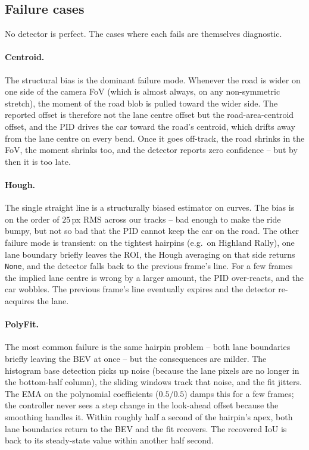 \subsection{Failure cases}

No detector is perfect. The cases where each fails are themselves
diagnostic.

\paragraph{Centroid.}
The structural bias is the dominant failure mode. Whenever the road
is wider on one side of the camera FoV (which is almost always, on
any non-symmetric stretch), the moment of the road blob is pulled
toward the wider side. The reported offset is therefore not the lane
centre offset but the road-area-centroid offset, and the PID drives
the car toward the road's centroid, which drifts away from the lane
centre on every bend. Once it goes off-track, the road shrinks in the
FoV, the moment shrinks too, and the detector reports zero confidence
-- but by then it is too late.

\paragraph{Hough.}
The single straight line is a structurally biased estimator on
curves. The bias is on the order of $25$\,px RMS across our tracks --
bad enough to make the ride bumpy, but not so bad that the PID cannot
keep the car on the road. The other failure mode is transient: on the
tightest hairpins (e.g.\ on Highland Rally), one lane boundary
briefly leaves the ROI, the Hough averaging on that side returns
\texttt{None}, and the detector falls back to the previous frame's
line. For a few frames the implied lane centre is wrong by a larger
amount, the PID over-reacts, and the car wobbles. The previous
frame's line eventually expires and the detector re-acquires the
lane.

\paragraph{PolyFit.}
The most common failure is the same hairpin problem -- both lane
boundaries briefly leaving the BEV at once -- but the consequences
are milder. The histogram base detection picks up noise (because the
lane pixels are no longer in the bottom-half column), the sliding
windows track that noise, and the fit jitters. The EMA on the
polynomial coefficients ($0.5/0.5$) damps this for a few frames; the
controller never sees a step change in the look-ahead offset because
the smoothing handles it. Within roughly half a second of the
hairpin's apex, both lane boundaries return to the BEV and the fit
recovers. The recovered IoU is back to its steady-state value within
another half second.

